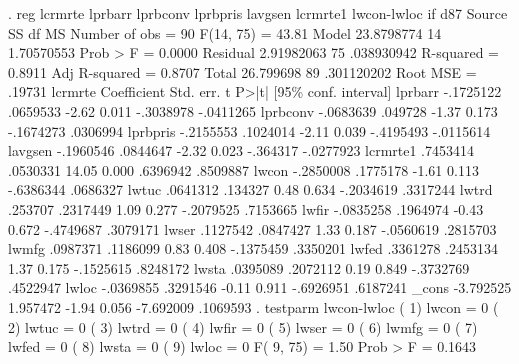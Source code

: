 . reg lcrmrte lprbarr lprbconv lprbpris lavgsen lcrmrte1 lwcon-lwloc if d87
{\smallskip}
      Source {\VBAR}       SS           df       MS      Number of obs   =        90
   F(14, 75)       =     43.81
       Model {\VBAR}  23.8798774        14  1.70570553   Prob > F        =    0.0000
    Residual {\VBAR}  2.91982063        75  .038930942   R-squared       =    0.8911
   Adj R-squared   =    0.8707
       Total {\VBAR}   26.799698        89  .301120202   Root MSE        =    .19731
{\smallskip}
     lcrmrte {\VBAR} Coefficient  Std. err.      t    P>|t|     [95\% conf. interval]
     lprbarr {\VBAR}  -.1725122   .0659533    -2.62   0.011    -.3038978   -.0411265
    lprbconv {\VBAR}  -.0683639    .049728    -1.37   0.173    -.1674273    .0306994
    lprbpris {\VBAR}  -.2155553   .1024014    -2.11   0.039    -.4195493   -.0115614
     lavgsen {\VBAR}  -.1960546   .0844647    -2.32   0.023     -.364317   -.0277923
    lcrmrte1 {\VBAR}   .7453414   .0530331    14.05   0.000     .6396942    .8509887
       lwcon {\VBAR}  -.2850008   .1775178    -1.61   0.113    -.6386344    .0686327
       lwtuc {\VBAR}   .0641312    .134327     0.48   0.634    -.2034619    .3317244
       lwtrd {\VBAR}    .253707   .2317449     1.09   0.277    -.2079525    .7153665
       lwfir {\VBAR}  -.0835258   .1964974    -0.43   0.672    -.4749687    .3079171
       lwser {\VBAR}   .1127542   .0847427     1.33   0.187    -.0560619    .2815703
       lwmfg {\VBAR}   .0987371   .1186099     0.83   0.408    -.1375459    .3350201
       lwfed {\VBAR}   .3361278   .2453134     1.37   0.175    -.1525615    .8248172
       lwsta {\VBAR}   .0395089   .2072112     0.19   0.849    -.3732769    .4522947
       lwloc {\VBAR}  -.0369855   .3291546    -0.11   0.911    -.6926951    .6187241
       _cons {\VBAR}  -3.792525   1.957472    -1.94   0.056    -7.692009    .1069593
{\smallskip}
. testparm lwcon-lwloc
{\smallskip}
 ( 1)  lwcon = 0
 ( 2)  lwtuc = 0
 ( 3)  lwtrd = 0
 ( 4)  lwfir = 0
 ( 5)  lwser = 0
 ( 6)  lwmfg = 0
 ( 7)  lwfed = 0
 ( 8)  lwsta = 0
 ( 9)  lwloc = 0
{\smallskip}
       F(  9,    75) =    1.50
            Prob > F =    0.1643
{\smallskip}
